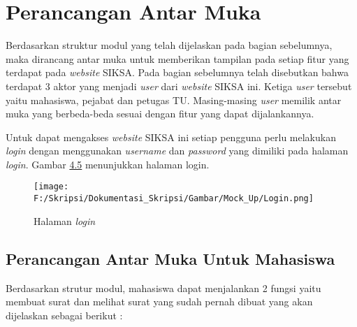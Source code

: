 \section{Perancangan Antar Muka}
\label{sec:perancangan_antar_muka}
Berdasarkan struktur modul yang telah dijelaskan pada bagian sebelumnya, maka dirancang antar muka untuk memberikan tampilan pada setiap fitur yang terdapat pada \textit{website} SIKSA. Pada bagian sebelumnya telah disebutkan bahwa terdapat 3 aktor yang menjadi \textit{user} dari \textit{website} SIKSA ini. Ketiga \textit{user} tersebut yaitu mahasiswa, pejabat dan petugas TU. Masing-masing \textit{user} memilik antar muka yang berbeda-beda sesuai dengan fitur yang dapat dijalankannya.

Untuk dapat mengakses \textit{website} SIKSA ini setiap pengguna perlu melakukan \textit{login} dengan menggunakan \textit{username} dan \textit{password} yang dimiliki pada halaman \textit{login}. Gambar \hyperlink{halaman_login}{4.5} menunjukkan halaman login.
\begin{figure}[H]
	\centering
		\texttt{[image: F:/Skripsi/Dokumentasi\_Skripsi/Gambar/Mock\_Up/Login.png]}
		\caption{Halaman \textit{login}}
		\label{fig:halaman_login}
	\end{figure}

\subsection{Perancangan Antar Muka Untuk Mahasiswa}
\label{sec:perancangan_antar_muka_mahasiswa}
Berdasarkan strutur modul, mahasiswa dapat menjalankan 2 fungsi yaitu membuat surat dan melihat surat yang sudah pernah dibuat yang akan dijelaskan sebagai berikut :

